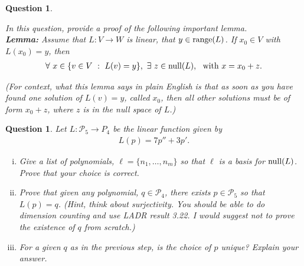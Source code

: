 \documentclass[12pt]{article}
\newtheorem{question}[thm]{Question}
\def\NullLA{\textnormal{null}}
\def\range{\textnormal{range}}
\def\P{\mathcal P}
\begin{document}
\vspace{.5cm}



\begin{question}\label{que:LemmaGenericSols}
	\normalfont
	
	In this question, provide a proof of the following important lemma. \\
	
	\textbf{Lemma:} Assume that $L:V\to W$ is linear, that $y\in\range(L)$. If $x_0\in V$ with $L(x_0)=y$, then 
	\begin{align*}
		\forall\ x\in\{ v\in V\ :\ L(v)=y \},\ \exists\ z\in \NullLA(L),\ \ \text{with}\ x=x_0+z.
	\end{align*}
	
	(For context, what this lemma says in plain English is that as soon as you have found one solution of $L(v)=y$, called $x_0$, then all other solutions must be of form $x_0+z$, where $z$ is in the null space of $L$.)
	
\end{question}


\vspace{.5cm}


\begin{question}
	\normalfont
	
	
	
	
	Let $L:\P_5\to P_4$ be the linear function given by 
	\begin{align*}
		L(p) = 7p'' + 3p'.
	\end{align*}
	\begin{enumerate}[(i)]
		\item Give a list of polynomials, $\ell = \{n_1,\dots, n_m\}$ so that $\ell$ is a basis for $\NullLA(L)$.  Prove that your choice is correct.
		
		
		\item Prove that given any polynomial, $q\in \P_4$, there exists $p\in\P_5$ so that $L(p)=q$.  (Hint, think about surjectivity. You should be able to do dimension counting and use LADR result 3.22.  I would suggest \emph{not} to prove the existence of $q$ from scratch.)
		
		\item For a given $q$ as in the previous step, is the choice of $p$ unique?  Explain your answer.
		
	\end{enumerate}
\end{question}


\vspace{.8cm}
\end{document}
